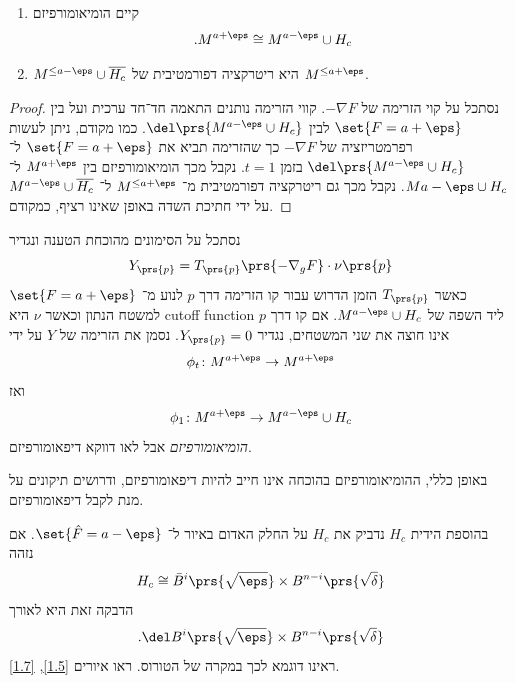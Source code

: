 \documentclass[a4paper,10pt,twoside,openany]{book}
\begin{document}
\begin{proposition}
\begin{enumerate}
\item קיים הומיאומורפיזם
\[\text{.} M^{a+\eps} \cong M^{a-\eps} \cup H_c\]

\item $M^{\leq a - \eps} \cup \overline{H_c}$
היא ריטרקציה דפורמטיבית של
$M^{\leq a + \eps}$.
\end{enumerate}
\end{proposition}

\begin{proof}
נסתכל על קוי הזרימה של
$-\nabla F$.
קווי הזרימה נותנים התאמה חד־חד ערכית ועל בין
$\set{F = a + \eps}$
לבין
$\del\prs{M^{a-\eps} \cup H_c}$.
כמו מקודם, ניתן לעשות רפרמטריזציה של
$-\nabla F$
כך שהזרימה תביא את
$\set{F = a + \eps}$
ל־%
$\del\prs{M^{a-\eps} \cup H_c}$
בזמן
$t = 1$.
נקבל מכך הומיאומורפיזם בין
$M^{a+\eps}$
ל־%
$M{a-\eps} \cup H_c$.
נקבל מכך גם ריטרקציה דפורמטיבית מ־%
$M^{\leq a + \eps}$
ל־%
$M^{a - \eps} \cup \overline{H_c}$
על ידי חתיכת השדה באופן שאינו רציף, כמקודם.
\end{proof}


\begin{remark}
נסתכל על הסימונים מהוכחת הטענה ונגדיר
\[Y_{\prs{p}} = {T_{\prs{p}}} \prs{- \nabla_g F} \cdot \nu\prs{p}\]
כאשר
$T_{\prs{p}}$
הזמן הדרוש עבור קו הזרימה דרך
$p$
לנוע מ־%
$\set{F = a + \eps}$
למשטח הנתון וכאשר
$\nu$
היא
\textenglish{cutoff function}
ליד השפה של
$M^{a-\eps} \cup H_c$.
אם קו דרך
$p$
אינו חוצה את שני המשטחים, נגדיר
$Y_{\prs{p}} = 0$.
נסמן את הזרימה של
$Y$
על ידי
\[\phi_t \colon M^{a+\eps} \to M^{a + \eps}\]
ואז
\[\phi_1 \colon M^{a+\eps} \to M^{a-\eps} \cup H_c\]
\emph{הומיאומורפיזם}
אבל לאו דווקא דיפאומורפיזם.

באופן כללי, ההומיאומורפיזם בהוכחה אינו חייב להיות דיפאומורפיזם, ודרושים תיקונים על מנת לקבל דיפאומורפיזם.
\end{remark}

\begin{remark}
בהוספת הידית
$H_c$
נדביק את
$H_c$
על החלק האדום באיור
ל־%
$\set{\hat{F} = a-\eps}$.
אם נזהה
\[H_c \cong \bar{B}^i\prs{\sqrt{\eps}} \times B^{n-i}\prs{\sqrt{\delta}}\]
הדבקה זאת היא לאורך
\[\text{.} \del B^i\prs{\sqrt{\eps}} \times B^{n-i}\prs{\sqrt{\delta}}\]
ראינו דוגמא לכך במקרה של הטורוס. ראו איורים
\ref{1.5}, \ref{1.7}.
\end{remark}
\end{document}
